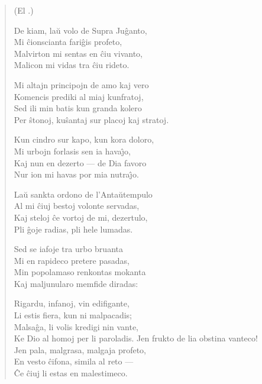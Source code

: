 \begin{verse}
\begin{center}
\footnotesize (El .)
\end{center}

                     De kiam, la\u u volo de Supra Ju\^ganto,\\
                     Mi \^cionscianta fari\^gis profeto,\\
                     Malvirton mi sentas en \^ciu vivanto,\\
                     Malicon mi vidas tra \^ciu rideto.

                     Mi altajn principojn de amo kaj vero\\
                     Komencis prediki al miaj kunfratoj,\\
                     Sed ili min batis kun granda kolero\\
                     Per \^stonoj, ku\^santaj sur placoj kaj stratoj.

                     Kun cindro sur kapo, kun kora doloro,\\
                     Mi urbojn forlasis sen ia hava\^{\j}o,\\
                     Kaj nun en dezerto --- de Dia favoro\\
                     Nur ion mi havas por mia nutra\^{\j}o.

                     La\u u sankta ordono de l'Anta\u utempulo\\
                     Al mi \^ciuj bestoj volonte servadas,\\
                     Kaj steloj \^ce vortoj de mi, dezertulo,\\
                     Pli \^goje radias, pli hele lumadas.

                     Sed se iafoje tra urbo bruanta\\
                     Mi en rapideco pretere pasadas,\\
                     Min popolamaso renkontas mokanta\\
                     Kaj maljunularo memfide diradas:

                     Rigardu, infanoj, vin edifigante,\\
                     Li estis fiera, kun ni malpacadis;\\
                     Malsa\^ga, li volis kredigi nin vante,\\
                     Ke Dio al homoj per li paroladis.
\newpage
                     Jen frukto de lia obstina vanteco!\\
                     Jen pala, malgrasa, malgaja profeto,\\
                     En vesto \^cifona, simila al reto ---\\
                     \^Ce \^ciuj li estas en malestimeco.

\end{verse}

\smallrule{}